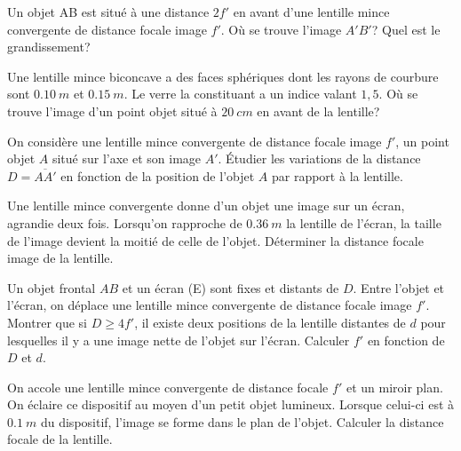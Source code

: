 \begin{exercice}%
Un objet AB est situé à une distance \(2f'\) en avant d'une lentille mince 
  convergente de distance focale image \(f'\). Où se trouve l'image \(A'B'\)? 
  Quel est le grandissement?
\end{exercice}%
%
\begin{exercice}%
Une lentille mince biconcave a des faces sphériques dont les rayons de courbure 
  sont \(\SI{0,10}{m}\) et \(\SI{0,15}{m}\). Le verre la constituant a un 
  indice valant \(1,5\). Où se trouve l'image d'un point objet situé à 
  \(\SI{20}{cm}\) en avant de la lentille?
\end{exercice}%
%
\begin{exercice}%
On considère une lentille mince convergente de distance focale image \(f'\), un 
  point objet \(A\) situé sur l'axe et son image \(A'\). Étudier les variations 
  de la distance \(D = \overline{AA'}\) en fonction de la position de l'objet 
  \(A\) par rapport à la lentille.
\end{exercice}%
%
\begin{exercice}%
Une lentille mince convergente donne d'un objet une image sur un écran, 
  agrandie deux fois. Lorsqu'on rapproche de \(\SI{0,36}{m}\) la lentille de 
  l'écran, la taille de l'image devient la moitié de celle de l'objet. 
  Déterminer la distance focale image de la lentille.
\end{exercice}%
%
\begin{exercice}%
Un objet frontal \(AB\) et un écran (E) sont fixes et distants de \(D\). Entre 
  l'objet et l'écran, on déplace une lentille mince convergente de distance 
  focale image \(f'\). Montrer que si \(D \geq 4f'\), il existe deux positions 
  de la lentille distantes de \(d\) pour lesquelles il y a une image nette de 
  l'objet sur l'écran. Calculer \(f'\) en fonction de \(D\) et \(d\).
\end{exercice}%
%
\begin{exercice}%
On accole une lentille mince convergente de distance focale \(f'\) et un miroir 
  plan. On éclaire ce dispositif au moyen d'un petit objet lumineux. Lorsque 
  celui-ci est à \(\SI{0,1}{m}\) du dispositif, l'image se forme dans le plan 
  de l'objet. Calculer la distance focale de la lentille.
\end{exercice}%
